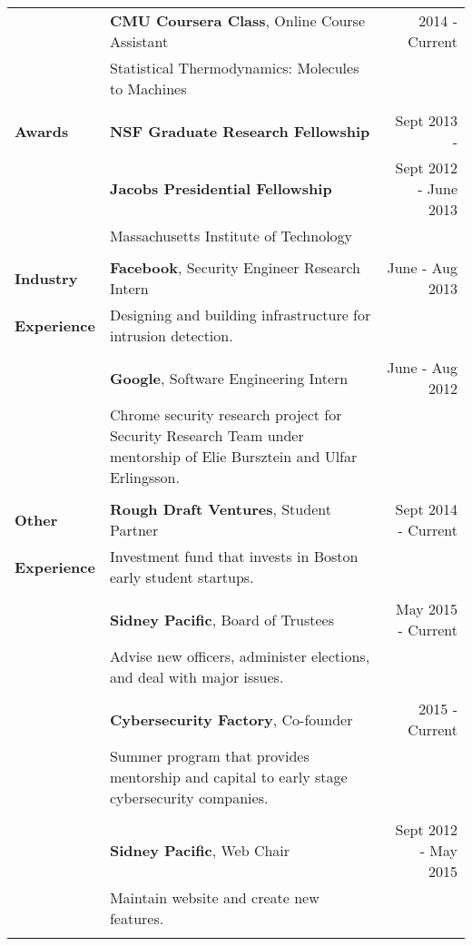 \documentclass[a4paper,10pt]{article}
\begin{document}
\begin{tabular*}{0.95 \textwidth} { p{0.9in} l @{\extracolsep{\fill}} r}
 & \textbf{CMU Coursera Class}, Online Course Assistant & 2014 - Current\\
 & Statistical Thermodynamics: Molecules to Machines & \\ \\

\textbf{Awards} & \textbf{NSF Graduate Research Fellowship} & Sept 2013 - \\
& \textbf{Jacobs Presidential Fellowship} & Sept 2012 - June 2013\\
& Massachusetts Institute of Technology \\
\\

\textbf{Industry}  & \textbf{Facebook}, Security Engineer Research Intern & June - Aug 2013 \\
\textbf{Experience} & \begin{minipage}[t]{0.5 \textwidth} 
Designing and building infrastructure for intrusion detection.
\end{minipage}
& \\ \\
& \textbf{Google}, Software Engineering Intern & June - Aug 2012 \\
& \begin{minipage}[t]{0.5 \textwidth} 
Chrome security research project for Security Research Team under mentorship of Elie Bursztein and Ulfar Erlingsson.
\end{minipage}
& \\ \\

\textbf{Other} & \textbf{Rough Draft Ventures}, Student Partner & Sept 2014 - Current \\
\textbf{Experience} & \begin{minipage}[t]{0.5 \textwidth}
  Investment fund that invests in Boston early student startups.
  \end{minipage} & \\ \\
& \textbf{Sidney Pacific}, Board of Trustees & May 2015 - Current \\
  & \begin{minipage}[t]{0.5 \textwidth}
  Advise new officers, administer elections, and deal with major issues.
  \end{minipage} & \\ \\
  & \textbf{Cybersecurity Factory}, Co-founder & 2015 - Current \\
  & \begin{minipage}[t]{0.5 \textwidth}
  Summer program that provides mentorship and capital to early stage
  cybersecurity companies.
  \end{minipage} & \\ \\
  & \textbf{Sidney Pacific}, Web Chair & Sept 2012 - May 2015 \\
 & \begin{minipage}[t]{0.5 \textwidth}
Maintain website and create new features.
\end{minipage}
& \\ \\

\end{tabular*}
\end{document}
